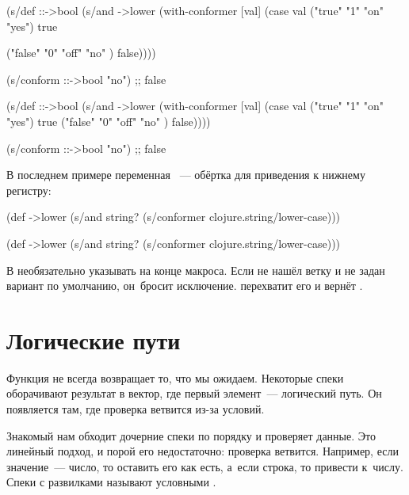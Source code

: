 \ifnarrow


\begin{clojure}
(s/def ::->bool
  (s/and
   ->lower
   (with-conformer [val]
     (case val
       ("true"  "1" "on"  "yes")
       true

       ("false" "0" "off" "no" )
       false))))

(s/conform ::->bool "no")
;; false
\end{clojure}


\else


\begin{clojure}
(s/def ::->bool
  (s/and
   ->lower
   (with-conformer [val]
     (case val
       ("true"  "1" "on"  "yes") true
       ("false" "0" "off" "no" ) false))))

(s/conform ::->bool "no")
;; false
\end{clojure}


\fi

\noindent
В последнем примере переменная ~--- обёртка для приведения к
нижнему регистру:

\ifnarrow


\begin{clojure}
(def ->lower
  (s/and
    string?
    (s/conformer
      clojure.string/lower-case)))
\end{clojure}

\else


\begin{clojure}
(def ->lower
  (s/and
    string?
    (s/conformer clojure.string/lower-case)))
\end{clojure}


\fi

В  необязательно указывать  на конце
макроса. Если  не нашёл ветку и не задан вариант по умолчанию,
он~бросит исключение.  перехватит его и вернёт
.

\section{Логические пути}


Функция  не всегда возвращает то, что мы ожидаем. Некоторые
спеки оборачивают результат в вектор, где первый элемент~--- логический путь. Он
появляется там, где проверка ветвится из-за условий.

Знакомый нам  обходит дочерние спеки по порядку и проверяет
данные. Это линейный подход, и порой его недостаточно: проверка
ветвится. Например, если значение~--- число, то оставить его как есть, а~если
строка, то привести к~числу. Спеки с развилками называют условными
.

